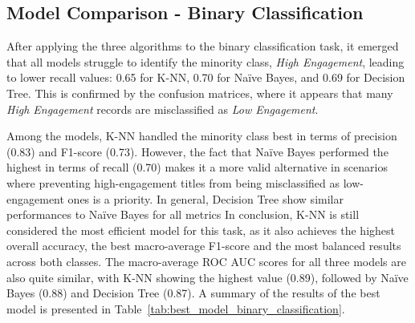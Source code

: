 \subsection{Model Comparison - Binary Classification}
After applying the three algorithms to the binary classification task, it emerged that all models struggle to identify the minority class, 
\textit{High Engagement}, leading to lower recall values: 0.65 for K-NN, 0.70 for Naïve Bayes, and 0.69 for Decision Tree. 
This is confirmed by the confusion matrices, where it appears that many \textit{High Engagement} records are misclassified as \textit{Low Engagement}.

Among the models, K-NN handled the minority class best in terms of precision (0.83) and F1-score (0.73). 
However, the fact that Naïve Bayes performed the highest in terms of recall (0.70) makes it a more valid alternative in scenarios where preventing 
high-engagement titles from being misclassified as low-engagement ones is a priority. In general, Decision Tree show similar performances to Naïve Bayes for all metrics
In conclusion, K-NN is still considered the most efficient model for this task, as it also achieves the highest overall accuracy, 
the best macro-average F1-score and the most balanced results across both classes. 
The macro-average ROC AUC scores for all three models are also quite similar, with K-NN showing the highest value (0.89), 
followed by Naïve Bayes (0.88) and Decision Tree (0.87).
A summary of the results of the best model is presented in Table~\ref{tab:best_model_binary_classification}.

